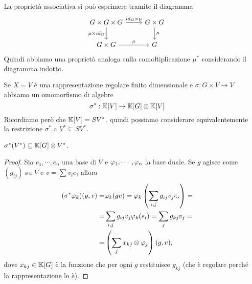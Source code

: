 \begin{remark}
La propriet\`a associativa si pu\`o esprimere tramite il diagramma
\[\begin{tikzcd}
	{G\times G\times G} & {G\times G} \\
	{G\times G} & G
	\arrow["{id_G\times\mu}", from=1-1, to=1-2]
	\arrow["{\mu\times id_G}"', from=1-1, to=2-1]
	\arrow["\mu", from=1-2, to=2-2]
	\arrow["\mu", from=2-1, to=2-2]
\end{tikzcd}\]
Quindi abbiamo una propriet\`a analoga sulla comoltiplicazione $\mu^\ast$ considerando il diagramma indotto.
\end{remark}

\begin{remark}
Se $X=V$ \`e una rappresentazione regolare finito dimensionale e $\sigma:G\times V\to V$ abbiamo un omomorfismo di algebre
\[\sigma^\ast:\mathbb{K}[V]\to \mathbb{K}[G]\otimes\mathbb{K}[V]\]
Ricordiamo per\`o che $\mathbb{K}[V]=SV^\ast$, quindi possiamo considerare equivalentemente la restrizione $\sigma^\ast$ a $V^\ast\subseteq SV^\ast$.
\end{remark}

\begin{lemma}
$\sigma^\ast(V^\ast)\subseteq \mathbb{K}[G]\otimes V^\ast$.
\end{lemma}
\begin{proof}
Sia $e_1,\cdots, e_n$ una base di $V$ e $\varphi_1,\cdots, \varphi_n$ la base duale. Se $g$ agisce come $(g_{ij})$ su $V$ e $v=\sum v_ie_i$ allora
\begin{align*}
    (\sigma^\ast \varphi_k)(g,v)=&\varphi_k(gv)=\varphi_k\left({\sum_{i,j} g_{ij}v_je_i}\right)=\\
    =&\sum_{i,j} g_{ij}v_j\varphi_k(e_i)=\sum_j g_{kj}v_j=\\
    =&\left({\sum_j x_{kj}\otimes \varphi_j}\right)(g,v),
\end{align*}
dove $x_{kj}\in \mathbb{K}[G]$ \`e la funzione che per ogni $g$ restituisce $g_{kj}$ (che \`e regolare perch\'e la rappresentazione lo \`e).
\end{proof}


